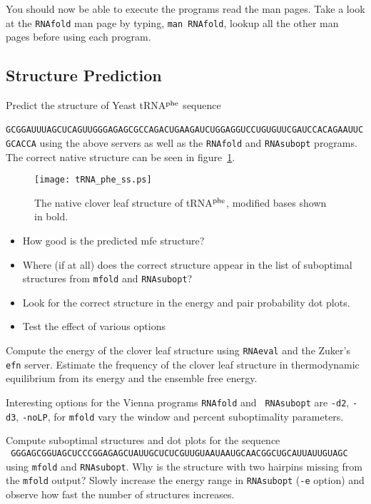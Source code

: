 \documentclass{article}
\begin{document}
You should now be able to execute the programs read the man pages. Take a
look at the {\tt RNAfold} man page by typing, {\tt man RNAfold}, lookup
all the other man pages before using each program.


\subsection{Structure Prediction}

Predict the structure of Yeast tRNA$^{\rm phe}$ sequence\\
{\small\tt
GCGGAUUUAGCUCAGUUGGGAGAGCGCCAGACUGAAGAUCUGGAGGUCCUGUGUUCGAUCCACAGAAUUCGCACCA}
using the above servers as well as the {\tt RNAfold} and {\tt RNAsubopt}
programs. The correct native structure can be seen in
figure~\ref{fig:tRNAsec}. 

\begin{figure}[ht]
\centerline{
\texttt{[image: tRNA\_phe\_ss.ps]}}
\caption{The native clover leaf structure of tRNA$^{\rm phe}$, modified
bases shown in bold.} 
\label{fig:tRNAsec}
\end{figure}

\begin{itemize}
\item How good is the predicted mfe structure?
\item Where (if at all) does the correct structure appear in the list of
suboptimal structures from {\tt mfold} and {\tt RNAsubopt}?
\item Look for the correct structure in the energy and pair probability
dot plots.
\item Test the effect of various options
\end{itemize}

Compute the energy of the clover leaf structure using {\tt RNAeval} and the
Zuker's {\tt efn} server. Estimate the frequency of the clover leaf
structure in thermodynamic equilibrium from its energy and the ensemble free
energy.

Interesting options for the Vienna programs {\tt RNAfold} and {\tt
RNAsubopt} are {\tt -d2}, {\tt -d3}, {\tt -noLP}, for {\tt mfold} vary the
window and percent suboptimality parameters.

Compute suboptimal structures and dot plots for the sequence\\
{\small\tt
GGGAGCGGUAGCUCCCGGAGAGCUAUUGCUCUCGUUGUAAUAAUGCAACGGCUGCAUUAUUGUAGC}\\
using {\tt mfold} and {\tt RNAsubopt}.
Why is the structure with two hairpins missing from the {\tt mfold}
output? Slowly increase the energy range in {\tt RNAsubopt} ({\tt -e}
option) and observe how fast the number of structures increases.
\end{document}
